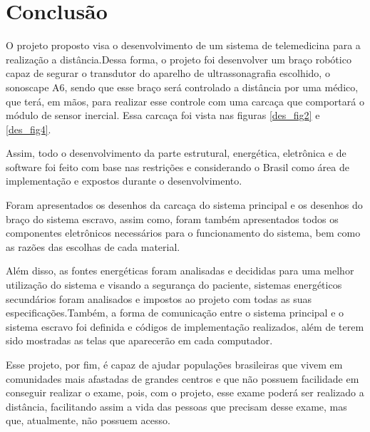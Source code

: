 \chapter{Conclusão}
O projeto proposto visa o desenvolvimento de um sistema de telemedicina para a realização a distância.Dessa forma, o projeto foi desenvolver um braço robótico capaz de segurar o transdutor do aparelho de ultrassonagrafia escolhido, o sonoscape A6, sendo que esse braço será controlado a distância por uma médico, que terá, em mãos, para realizar esse controle com uma carcaça que comportará o módulo de sensor inercial. Essa carcaça foi vista nas figuras \ref{des_fig2} e \ref{des_fig4}.

Assim, todo o desenvolvimento da parte estrutural, energética, eletrônica e de software foi feito com base nas restrições e considerando o Brasil como área de implementação e expostos durante o desenvolvimento.

Foram apresentados os desenhos da carcaça do sistema principal e os desenhos do braço do sistema escravo, assim como, foram também apresentados todos os componentes eletrônicos necessários para o funcionamento do sistema, bem como as razões das escolhas de cada material.

Além disso, as fontes energéticas foram analisadas e decididas para uma melhor utilização do sistema e visando a segurança do paciente, sistemas energéticos secundários foram analisados e impostos ao projeto com todas as suas especificações.Também, a forma de comunicação entre o sistema principal e o sistema escravo foi definida e códigos de implementação realizados, além de terem sido mostradas as telas que aparecerão em cada computador.

Esse projeto, por fim, é capaz de ajudar populações brasileiras que vivem em comunidades mais afastadas de grandes centros e que não possuem facilidade em conseguir realizar o exame, pois, com o projeto, esse exame poderá ser realizado a distância, facilitando assim a vida das pessoas que precisam desse exame, mas que, atualmente, não possuem acesso.

